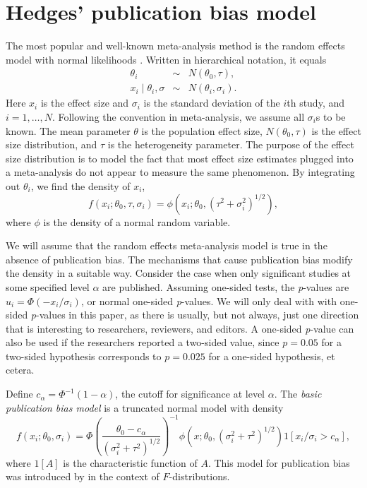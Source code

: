 \documentclass[article]{ajs}
\numberwithin{equation}{section}
\numberwithin{figure}{section}
\theoremstyle{plain}
\theoremstyle{definition}
\theoremstyle{definition}
\theoremstyle{plain}
\renewcommand{\sqrt}[1]{{(#1)^{1/2}}}
\begin{document}
\section{Hedges' publication bias model}

The most popular and well-known meta-analysis method is the random effects model with normal likelihoods \citep{hedges1998fixed}. Written in hierarchical notation, it equals
\begin{eqnarray*}
\theta_{i} & \sim & N(\theta_{0},\tau),\\
x_{i}\mid\theta_{i},\sigma & \sim & N(\theta_{i},\sigma_{i}).
\end{eqnarray*}
Here $x_{i}$ is the effect size and $\sigma_{i}$ is the standard deviation of the $i$th study, and $i=1,\ldots,N$. Following the convention in meta-analysis, we assume all $\sigma_{i}$s to be known. The mean parameter $\theta$ is the population effect size, $N(\theta_{0},\tau)$ is the effect size distribution, and $\tau$ is the heterogeneity parameter. The purpose of the effect size distribution is to model the fact that most effect size estimates plugged into a meta-analysis do not appear to measure the same phenomenon. By integrating out $\theta_{i}$, we find the density of $x_{i}$,
\[
f(x_{i};\theta_{0},\tau,\sigma_{i})=\phi(x_{i};\theta_{0},\sqrt{\tau^{2}+\sigma_{i}^{2}}),
\]
where $\phi$ is the density of a normal random variable. 

We will assume that the random effects meta-analysis model is true in the absence of publication bias. The mechanisms that cause publication bias modify the density in a suitable way. Consider the case when only significant studies at some specified level $\alpha$ are published. Assuming one-sided tests, the \textit{p}-values are $u_{i}=\Phi(-x_{i}/\sigma_{i})$, or normal one-sided \textit{p}-values. We will only deal with with one-sided \textit{p}-values in this paper, as there is usually, but not always, just one direction that is interesting to researchers, reviewers, and editors. A one-sided \textit{p}-value can also be used if the researchers reported a two-sided value, since $p=0.05$ for a two-sided hypothesis corresponds to $p=0.025$ for a one-sided hypothesis, et cetera.

Define $c_{\alpha}=\Phi^{-1}(1-\alpha)$, the cutoff for significance at level $\alpha$. The \emph{basic publication bias model} is a truncated normal model with density
\begin{equation}
f(x_{i};\theta_{0},\sigma_{i})=\Phi\left(\frac{\theta_{0}-c_{\alpha}}{\sqrt{\sigma_{i}^{2}+\tau^{2}}}\right)^{-1}\phi(x;\theta_{0},\sqrt{\sigma_{i}^{2}+\tau^{2}})1[x_{i}/\sigma_{i}>c_{\alpha}],\label{eq:selection for significance model}
\end{equation}
where $1[A]$ is the characteristic function of $A$. This model for publication bias was introduced by \citet{hedges1984estimation} in the context of $F$-distributions.
\end{document}
